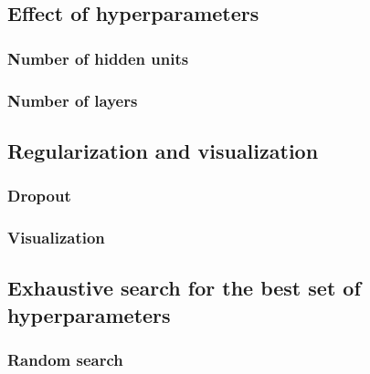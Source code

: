 \documentclass[a4paper,12pt]{article}
\begin{document}
\clearpage
\subsection{Effect of hyperparameters}

\clearpage
\subsubsection{Number of hidden units}


\clearpage
\subsubsection{Number of layers}

\clearpage
\subsection{Regularization and visualization}

\clearpage
\subsubsection{Dropout}


\clearpage
\subsubsection{Visualization}

\clearpage
\subsection{Exhaustive search for the best set of hyperparameters}

\clearpage
\subsubsection{Random search}
\end{document}
